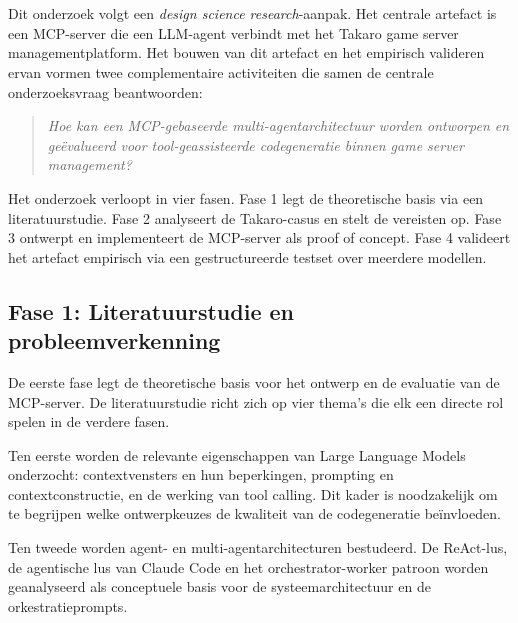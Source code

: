 \chapter{}%
\label{ch:methodologie}

Dit onderzoek volgt een \textit{design science research}-aanpak. Het centrale artefact is een MCP-server die een LLM-agent verbindt met het Takaro game server managementplatform. Het bouwen van dit artefact en het empirisch valideren ervan vormen twee complementaire activiteiten die samen de centrale onderzoeksvraag beantwoorden:

\begin{quote}
\textit{Hoe kan een MCP-gebaseerde multi-agentarchitectuur worden ontworpen en geëvalueerd voor tool-geassisteerde codegeneratie binnen game server management?}
\end{quote}

Het onderzoek verloopt in vier fasen. Fase 1 legt de theoretische basis via een literatuurstudie. Fase 2 analyseert de Takaro-casus en stelt de vereisten op. Fase 3 ontwerpt en implementeert de MCP-server als proof of concept. Fase 4 valideert het artefact empirisch via een gestructureerde testset over meerdere modellen.

\section{Fase 1: Literatuurstudie en probleemverkenning}\label{sec:fase1}

De eerste fase legt de theoretische basis voor het ontwerp en de evaluatie van de MCP-server. De literatuurstudie richt zich op vier thema’s die elk een directe rol spelen in de verdere fasen.

Ten eerste worden de relevante eigenschappen van Large Language Models onderzocht: contextvensters en hun beperkingen, prompting en contextconstructie, en de werking van tool calling. Dit kader is noodzakelijk om te begrijpen welke ontwerpkeuzes de kwaliteit van de codegeneratie beïnvloeden.

Ten tweede worden agent- en multi-agentarchitecturen bestudeerd. De ReAct-lus, de agentische lus van Claude Code en het orchestrator-worker patroon worden geanalyseerd als conceptuele basis voor de systeemarchitectuur en de orkestratieprompts.

